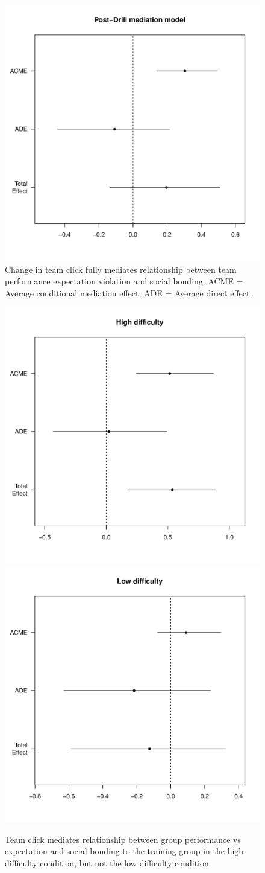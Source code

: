 \begin{figure}
  \centering
  \includegraphics[width=0.5\linewidth,keepaspectratio] {images/groupPerfExpClickMediationPlot}
  \caption{Change in team click fully mediates relationship between team performance expectation violation and social bonding. ACME = Average conditional mediation effect; ADE = Average direct effect.}
  \label{fig:groupPerfExpClickChangeMedPlot}
\end{figure}

\begin{figure}
  \centering
  \includegraphics[width=0.3\linewidth,keepaspectratio] {images/groupPerfExpClickMediationPlotHigh}
  \includegraphics[width=0.3\linewidth,keepaspectratio] {images/groupPerfExpClickMediationPlotLow}
  \caption{Team click mediates relationship between group performance vs expectation and social bonding to the training group in the high difficulty condition, but not the low difficulty condition}
  \label{fig:groupPerfClickChangeMedPlotHighLow}
\end{figure}



